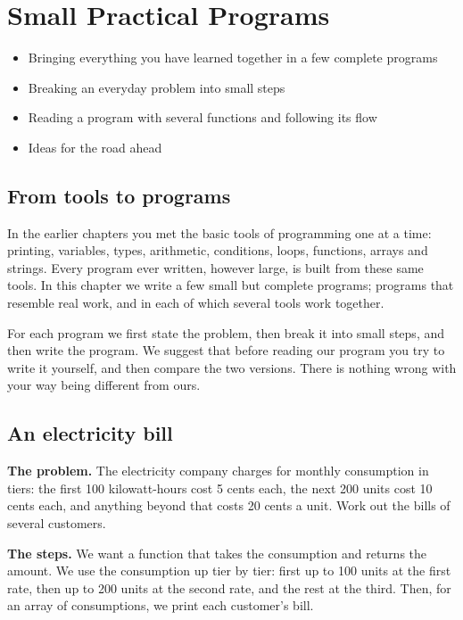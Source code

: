 \chapter{Small Practical Programs}\label{ch:projects}

\begin{goals}
\begin{itemize}
  \item Bringing everything you have learned together in a few complete programs
  \item Breaking an everyday problem into small steps
  \item Reading a program with several functions and following its flow
  \item Ideas for the road ahead
\end{itemize}
\end{goals}

\section{From tools to programs}

In the earlier chapters you met the basic tools of programming one at a
time: printing, variables, types, arithmetic, conditions, loops, functions,
arrays and strings. Every program ever written, however large, is built from
these same tools. In this chapter we write a few small but complete
programs; programs that resemble real work, and in each of which several
tools work together.

For each program we first state the problem, then break it into small steps,
and then write the program. We suggest that before reading our program you
try to write it yourself, and then compare the two versions. There is
nothing wrong with your way being different from ours.

\section{An electricity bill}

\textbf{The problem.} The electricity company charges for monthly
consumption in tiers: the first 100 kilowatt-hours cost 5 cents each, the
next 200 units cost 10 cents each, and anything beyond that costs 20 cents
a unit. Work out the bills of several customers.

\textbf{The steps.} We want a function that takes the consumption and
returns the amount. We use the consumption up tier by tier: first up to 100
units at the first rate, then up to 200 units at the second rate, and the
rest at the third. Then, for an array of consumptions, we print each
customer's bill.

